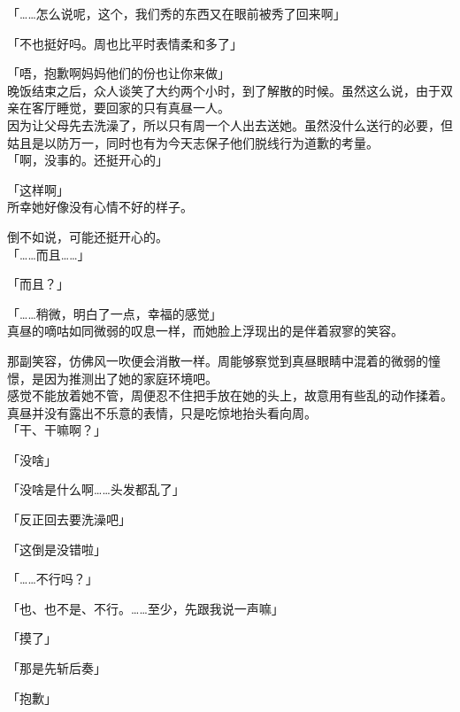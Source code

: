 「……怎么说呢，这个，我们秀的东西又在眼前被秀了回来啊」

「不也挺好吗。周也比平时表情柔和多了」\\

\vspace{2\baselineskip}

「唔，抱歉啊妈妈他们的份也让你来做」\\

晚饭结束之后，众人谈笑了大约两个小时，到了解散的时候。虽然这么说，由于双亲在客厅睡觉，要回家的只有真昼一人。\\

因为让父母先去洗澡了，所以只有周一个人出去送她。虽然没什么送行的必要，但姑且是以防万一，同时也有为今天志保子他们脱线行为道歉的考量。\\

「啊，没事的。还挺开心的」

「这样啊」\\

所幸她好像没有心情不好的样子。

倒不如说，可能还挺开心的。\\

「……而且……」

「而且？」

「……稍微，明白了一点，幸福的感觉」\\

真昼的嘀咕如同微弱的叹息一样，而她脸上浮现出的是伴着寂寥的笑容。

那副笑容，仿佛风一吹便会消散一样。周能够察觉到真昼眼睛中混着的微弱的憧憬，是因为推测出了她的家庭环境吧。\\

感觉不能放着她不管，周便忍不住把手放在她的头上，故意用有些乱的动作揉着。\\

真昼并没有露出不乐意的表情，只是吃惊地抬头看向周。\\

「干、干嘛啊？」

「没啥」

「没啥是什么啊……头发都乱了」

「反正回去要洗澡吧」

「这倒是没错啦」

「……不行吗？」

「也、也不是、不行。……至少，先跟我说一声嘛」

「摸了」

「那是先斩后奏」

「抱歉」\\

